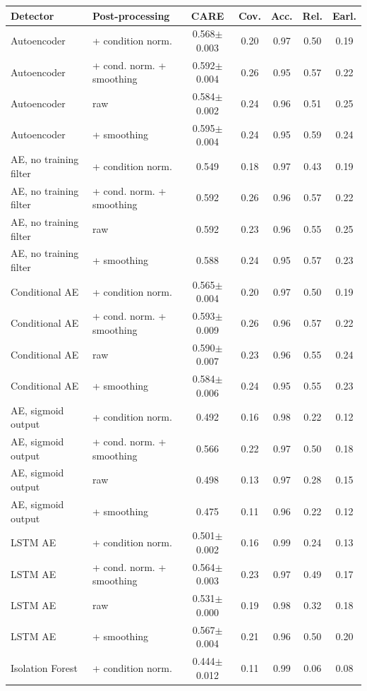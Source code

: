 \begin{tabular}{llccccc}
\toprule
Detector & Post-processing & CARE & Cov. & Acc. & Rel. & Earl.\\
\midrule
Autoencoder & + condition norm. & 0.568$\pm$0.003 & 0.20 & 0.97 & 0.50 & 0.19\\
Autoencoder & + cond. norm. + smoothing & 0.592$\pm$0.004 & 0.26 & 0.95 & 0.57 & 0.22\\
Autoencoder & raw & 0.584$\pm$0.002 & 0.24 & 0.96 & 0.51 & 0.25\\
Autoencoder & + smoothing & 0.595$\pm$0.004 & 0.24 & 0.95 & 0.59 & 0.24\\
AE, no training filter & + condition norm. & 0.549 & 0.18 & 0.97 & 0.43 & 0.19\\
AE, no training filter & + cond. norm. + smoothing & 0.592 & 0.26 & 0.96 & 0.57 & 0.22\\
AE, no training filter & raw & 0.592 & 0.23 & 0.96 & 0.55 & 0.25\\
AE, no training filter & + smoothing & 0.588 & 0.24 & 0.95 & 0.57 & 0.23\\
Conditional AE & + condition norm. & 0.565$\pm$0.004 & 0.20 & 0.97 & 0.50 & 0.19\\
Conditional AE & + cond. norm. + smoothing & 0.593$\pm$0.009 & 0.26 & 0.96 & 0.57 & 0.22\\
Conditional AE & raw & 0.590$\pm$0.007 & 0.23 & 0.96 & 0.55 & 0.24\\
Conditional AE & + smoothing & 0.584$\pm$0.006 & 0.24 & 0.95 & 0.55 & 0.23\\
AE, sigmoid output & + condition norm. & 0.492 & 0.16 & 0.98 & 0.22 & 0.12\\
AE, sigmoid output & + cond. norm. + smoothing & 0.566 & 0.22 & 0.97 & 0.50 & 0.18\\
AE, sigmoid output & raw & 0.498 & 0.13 & 0.97 & 0.28 & 0.15\\
AE, sigmoid output & + smoothing & 0.475 & 0.11 & 0.96 & 0.22 & 0.12\\
LSTM AE & + condition norm. & 0.501$\pm$0.002 & 0.16 & 0.99 & 0.24 & 0.13\\
LSTM AE & + cond. norm. + smoothing & 0.564$\pm$0.003 & 0.23 & 0.97 & 0.49 & 0.17\\
LSTM AE & raw & 0.531$\pm$0.000 & 0.19 & 0.98 & 0.32 & 0.18\\
LSTM AE & + smoothing & 0.567$\pm$0.004 & 0.21 & 0.96 & 0.50 & 0.20\\
Isolation Forest & + condition norm. & 0.444$\pm$0.012 & 0.11 & 0.99 & 0.06 & 0.08\\

\end{tabular}
